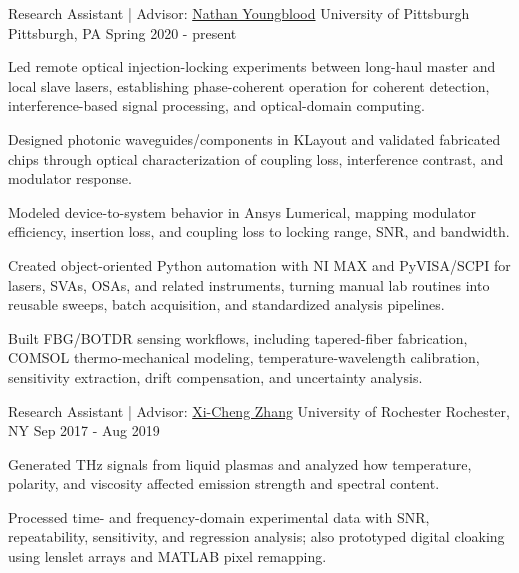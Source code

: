 
\begin{cventries}

  \cventry
    {Research Assistant | Advisor: \href{https://pitt-photonics.github.io/}{Nathan Youngblood}}
    {University of Pittsburgh}
    {Pittsburgh, PA}
    {Spring 2020 - present}
    {
      \begin{cvitems}
        \item {Led remote optical injection-locking experiments between long-haul master and local slave lasers, establishing phase-coherent operation for coherent detection, interference-based signal processing, and optical-domain computing.}
        \item {Designed photonic waveguides/components in KLayout and validated fabricated chips through optical characterization of coupling loss, interference contrast, and modulator response.}
        \item {Modeled device-to-system behavior in Ansys Lumerical, mapping modulator efficiency, insertion loss, and coupling loss to locking range, SNR, and bandwidth.}
        \item {Created object-oriented Python automation with NI MAX and PyVISA/SCPI for lasers, SVAs, OSAs, and related instruments, turning manual lab routines into reusable sweeps, batch acquisition, and standardized analysis pipelines.}
        \item {Built FBG/BOTDR sensing workflows, including tapered-fiber fabrication, COMSOL thermo-mechanical modeling, temperature-wavelength calibration, sensitivity extraction, drift compensation, and uncertainty analysis.}
      \end{cvitems}
    }

  \cventry
    {Research Assistant | Advisor: \href{https://labsites.rochester.edu/zhang/}{Xi-Cheng Zhang}}
    {University of Rochester}
    {Rochester, NY}
    {Sep 2017 - Aug 2019}
    {
      \begin{cvitems}
        \item {Generated THz signals from liquid plasmas and analyzed how temperature, polarity, and viscosity affected emission strength and spectral content.}
        \item {Processed time- and frequency-domain experimental data with SNR, repeatability, sensitivity, and regression analysis; also prototyped digital cloaking using lenslet arrays and MATLAB pixel remapping.}
      \end{cvitems}
    }

\end{cventries}
